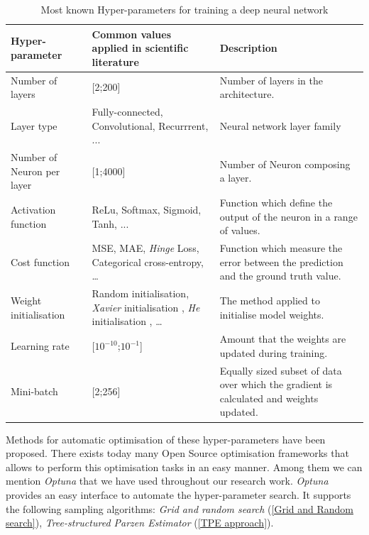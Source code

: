 \begin{table}
\label{tab:hyper-parameters}
\begin{tabular}{|l|p{4cm}|p{4cm}|}
\hline
\textbf{Hyper-parameter}           &  \textbf{Common values applied in scientific literature}  & \textbf{Description}                                    \\ \hline
Number of layers          & {[}2;200{]}                                     & Number of layers in the architecture.           \\ \hline
Layer type                & Fully-connected, Convolutional, Recurrrent, ... & Neural network layer family                                               \\ \hline
Number of Neuron per layer & {[}1;4000{]}                                    & Number of Neuron composing a layer.                                               \\ \hline
Activation function       & ReLu, Softmax, Sigmoid, Tanh, ...               & Function which define the output of the neuron in a range of values.                                                \\ \hline
Cost function             & MSE, MAE, \textit{Hinge} Loss, Categorical cross-entropy, \dots                                                & Function which measure the error between the prediction and the ground truth value.                                               \\ \hline
Weight initialisation     & Random initialisation, \textit{Xavier} initialisation \cite{glorot2010understanding}, \textit{He} initialisation \citep{he2015delving}, \dots                                                & The method applied to initialise model weights. \\ \hline
Learning rate             & {[}$10^{-10}$;$10^{-1}${]}                                                  &  Amount that the weights are updated during training.                                               \\ \hline
Mini-batch                & {[}2;256{]}                                     & Equally sized subset of data over which the gradient is calculated and weights updated.                                               \\ \hline
\end{tabular}
\caption{Most known Hyper-parameters for training a deep neural network}
\end{table}

Methods for automatic optimisation of these hyper-parameters have been proposed. There exists today many Open Source optimisation frameworks that allows to perform this optimisation tasks in an easy manner. Among them we can mention \textit{Optuna} \citep{optuna_2019} that we have used throughout our research work. \textit{Optuna} provides an easy interface to automate the hyper-parameter search. It supports the following sampling algorithms: \textit{Grid and random search} (\ref{Grid and Random search}), \textit{Tree-structured Parzen Estimator} (\ref{TPE approach}).


